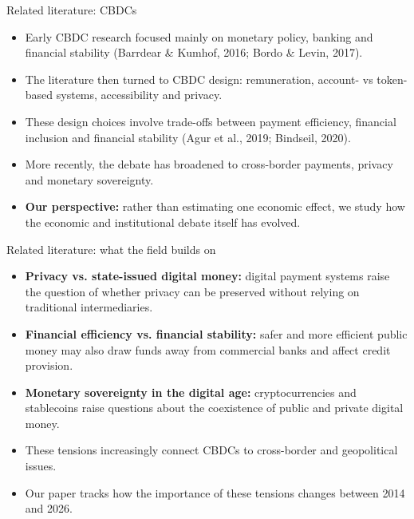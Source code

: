\documentclass[aspectratio=169,10pt]{beamer}
\begin{document}
\begin{frame}{Related literature: CBDCs}
\begin{itemize}
    \item Early CBDC research focused mainly on monetary policy, banking and financial stability (Barrdear \& Kumhof, 2016; Bordo \& Levin, 2017).

    \item The literature then turned to CBDC design: remuneration, account- vs token-based systems, accessibility and privacy.

    \item  These design choices involve trade-offs between payment efficiency, financial inclusion and financial stability (Agur et al., 2019; Bindseil, 2020).

    \item  More recently, the debate has broadened to cross-border payments, privacy and monetary sovereignty.

    \item \textbf{Our perspective:} rather than estimating one economic effect, we study how the economic and institutional debate itself has evolved.

\end{itemize}

\end{frame}

\begin{frame}{Related literature: what the field builds on}
\begin{itemize}
\item \textbf{Privacy vs. state-issued digital money:} digital payment systems raise the question of whether privacy can be preserved without relying on traditional intermediaries.

\item \textbf{Financial efficiency vs. financial stability:} safer and more efficient public money may also draw funds away from commercial banks and affect credit provision.

\item \textbf{Monetary sovereignty in the digital age:} cryptocurrencies and stablecoins raise questions about the coexistence of public and private digital money.

\item[$\Rightarrow$] These tensions increasingly connect CBDCs to cross-border and geopolitical issues.

\item[$\Rightarrow$] Our paper tracks how the importance of these tensions changes between 2014 and 2026.

\end{itemize}
\end{frame}
\end{document}
